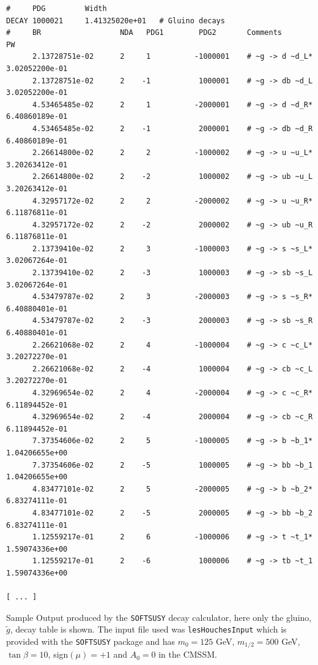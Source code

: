 \documentclass[final,3p,times,pdflatex]{elsarticle}
\begin{document}
\begin{center}
\begin{table} %
\centering
{\small
\begin{verbatim}
#     PDG         Width             
DECAY 1000021     1.41325020e+01   # Gluino decays
#     BR                  NDA   PDG1        PDG2       Comments                          PW                
      2.13728751e-02      2     1          -1000001    # ~g -> d ~d_L*              3.02052200e-01    
      2.13728751e-02      2    -1           1000001    # ~g -> db ~d_L              3.02052200e-01    
      4.53465485e-02      2     1          -2000001    # ~g -> d ~d_R*              6.40860189e-01    
      4.53465485e-02      2    -1           2000001    # ~g -> db ~d_R              6.40860189e-01    
      2.26614800e-02      2     2          -1000002    # ~g -> u ~u_L*              3.20263412e-01    
      2.26614800e-02      2    -2           1000002    # ~g -> ub ~u_L              3.20263412e-01    
      4.32957172e-02      2     2          -2000002    # ~g -> u ~u_R*              6.11876811e-01    
      4.32957172e-02      2    -2           2000002    # ~g -> ub ~u_R              6.11876811e-01    
      2.13739410e-02      2     3          -1000003    # ~g -> s ~s_L*              3.02067264e-01    
      2.13739410e-02      2    -3           1000003    # ~g -> sb ~s_L              3.02067264e-01    
      4.53479787e-02      2     3          -2000003    # ~g -> s ~s_R*              6.40880401e-01    
      4.53479787e-02      2    -3           2000003    # ~g -> sb ~s_R              6.40880401e-01    
      2.26621068e-02      2     4          -1000004    # ~g -> c ~c_L*              3.20272270e-01    
      2.26621068e-02      2    -4           1000004    # ~g -> cb ~c_L              3.20272270e-01    
      4.32969654e-02      2     4          -2000004    # ~g -> c ~c_R*              6.11894452e-01    
      4.32969654e-02      2    -4           2000004    # ~g -> cb ~c_R              6.11894452e-01    
      7.37354606e-02      2     5          -1000005    # ~g -> b ~b_1*              1.04206655e+00    
      7.37354606e-02      2    -5           1000005    # ~g -> bb ~b_1              1.04206655e+00    
      4.83477101e-02      2     5          -2000005    # ~g -> b ~b_2*              6.83274111e-01    
      4.83477101e-02      2    -5           2000005    # ~g -> bb ~b_2              6.83274111e-01    
      1.12559217e-01      2     6          -1000006    # ~g -> t ~t_1*              1.59074336e+00    
      1.12559217e-01      2    -6           1000006    # ~g -> tb ~t_1              1.59074336e+00    

[ ... ]
\end{verbatim}   
\caption{Sample Output produced by the {\tt SOFTSUSY} decay calculator, here only the 
gluino, $\tilde{g}$, decay table is shown. The input file used was {\tt lesHouchesInput}
which is provided with the {\tt SOFTSUSY} package and has $m_0 = 125$ GeV, $m_{1/2} = 500$ GeV,
$\tan\beta = 10$, sign$(\mu) = +1$ and $A_0 = 0$ in the CMSSM.} \label{sampleoutput}
}
\end{table}
\end{center}
\end{document}
